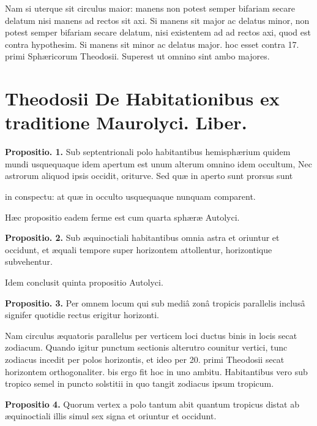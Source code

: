 \documentclass[11pt,a4paper]{article}
\begin{document}
Nam si uterque sit circulus  maior: manens non potest semper bifariam secare delatum nisi manens ad rectos sit axi. Si manens sit major ac delatus minor, non potest semper bifariam secare delatum, nisi existentem ad ad rectos axi, quod est contra hypothesim. Si manens sit minor ac delatus major. hoc esset contra 17. primi Sphæricorum Theodosii. Superest ut omnino sint ambo majores.

\section*{Theodosii De Habitationibus ex traditione Maurolyci. Liber.}

\textbf{Propositio. 1.} Sub septentrionali polo habitantibus hemisphærium quidem mundi usquequaque idem apertum est unum alterum omnino idem occultum, Nec astrorum aliquod ipsis occidit, oriturve. Sed quæ in aperto sunt prorsus sunt

in conspectu: at quæ in occulto usquequaque nunquam comparent.

Hæc propositio eadem ferme est cum quarta sphæræ Autolyci.

\textbf{Propositio. 2.} Sub æquinoctiali habitantibus omnia astra et oriuntur et occidunt, et æquali tempore super horizontem attollentur, horizontique subvehentur.

Idem conclusit quinta propositio Autolyci.

\textbf{Propositio. 3.} Per omnem locum qui sub mediâ zonâ tropicis parallelis inclusâ signifer quotidie rectus erigitur horizonti.

Nam circulus æquatoris parallelus per verticem loci ductus binis in locis secat zodiacum. Quando igitur punctum sectionis alterutro counitur vertici, tunc zodiacus incedit per polos horizontis, et ideo per 20. primi Theodosii secat horizontem orthogonaliter. bis ergo fit hoc in uno ambitu. Habitantibus vero sub tropico semel in puncto solstitii in quo tangit zodiacus ipsum tropicum.

\textbf{Propositio 4.} Quorum vertex a polo tantum abit quantum tropicus distat ab æquinoctiali illis simul sex signa et oriuntur et occidunt.
\end{document}
